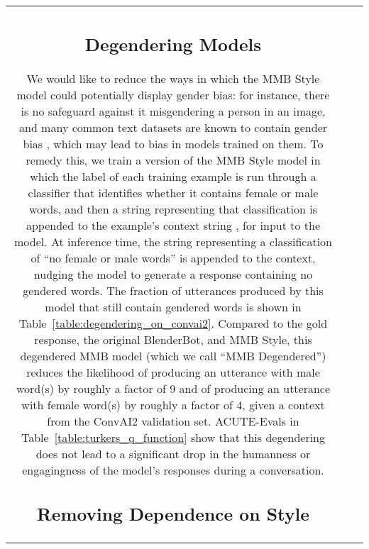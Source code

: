 \documentclass[11pt,a4paper]{article}
\begin{document}
\begin{table*}[t!]
\begin{adjustbox}{center=15.5cm}
\begin{small}
\begin{tabular*}{\textwidth}{ccl}
\subsection{Degendering Models}
\label{sec:degendering}

We would like to reduce the ways in which the MMB Style model could potentially display gender bias: for instance, there is no safeguard against it misgendering a person in an image, and many common text datasets are known to contain gender bias \citep{dinan2019queens, dinan2020multi}, which may lead to bias in models trained on them. To remedy this, we train a version of the MMB Style model in which the label of each training example is run through a classifier that identifies whether it contains female or male words, and then a string representing that classification is appended to the example's context string \citep{dinan2019queens}, for input to the model. At inference time, the string representing a classification of ``no female or male words'' is appended to the context, nudging the model to generate a response containing no gendered words. The fraction of utterances produced by this model that still contain gendered words is shown in Table~\ref{table:degendering_on_convai2}. Compared to the gold response, the original BlenderBot, and MMB Style, this degendered MMB model (which we call ``MMB Degendered'') reduces the likelihood of producing an utterance with male word(s) by roughly a factor of 9 and of producing an utterance with female word(s) by roughly a factor of 4, given a context from the ConvAI2 validation set. ACUTE-Evals in Table~\ref{table:turkers_q_function} show that this degendering does not lead to a significant drop in the humanness or engagingness of the model's responses during a conversation.

\subsection{Removing Dependence on Style}
\label{sec:removing_style}


\end{tabular*}
\end{small}
\end{adjustbox}
\end{table*}
\end{document}
